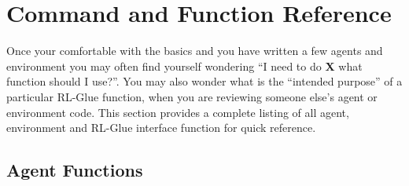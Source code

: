 \documentclass[11pt]{article}
\begin{document}
\section{Command and Function Reference}
\label{ref}
Once your comfortable with the basics and you have written a few agents and environment you may often find yourself wondering ``I need to do {\bf X} what function should I use?''. You may also wonder what is the ``intended purpose'' of a particular RL-Glue function, when you are reviewing someone else's agent or environment code. This section provides a complete listing of all agent, environment and RL-Glue interface function for quick reference.
\subsection{Agent Functions}
 
\end{document}

